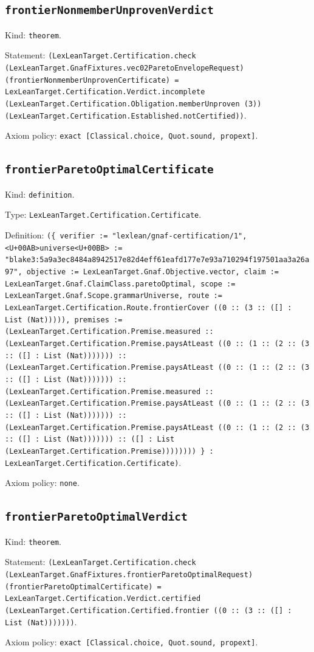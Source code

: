\documentclass[11pt]{article}
\begin{document}
\subsection*{\texttt{frontierNonmemberUnprovenVerdict}}
\noindent Kind: \texttt{theorem}.\par
\noindent Statement: \texttt{(LexLeanTarget.Certification.check (LexLeanTarget.GnafFixtures.vec02ParetoEnvelopeRequest) (frontierNonmemberUnprovenCertificate) = LexLeanTarget.Certification.Verdict.incomplete (LexLeanTarget.Certification.Obligation.memberUnproven (3)) (LexLeanTarget.Certification.Established.notCertified))}.\par
\noindent Axiom policy: \texttt{exact [Classical.choice, Quot.sound, propext]}.\par
\subsection*{\texttt{frontierParetoOptimalCertificate}}
\noindent Kind: \texttt{definition}.\par
\noindent Type: \texttt{LexLeanTarget.Certification.Certificate}.\par
\noindent Definition: \texttt{(\{ verifier := "lexlean/gnaf-certification/1", <U+00AB>universe<U+00BB> := "blake3:5a9a3ec8484a8942517e82d4eff61eafd177e7e93a710294f197501aa3a26a97", objective := LexLeanTarget.Gnaf.Objective.vector, claim := LexLeanTarget.Gnaf.ClaimClass.paretoOptimal, scope := LexLeanTarget.Gnaf.Scope.grammarUniverse, route := LexLeanTarget.Certification.Route.frontierCover ((0 :: (3 :: ([] : List (Nat))))), premises := (LexLeanTarget.Certification.Premise.measured :: (LexLeanTarget.Certification.Premise.paysAtLeast ((0 :: (1 :: (2 :: (3 :: ([] : List (Nat))))))) :: (LexLeanTarget.Certification.Premise.paysAtLeast ((0 :: (1 :: (2 :: (3 :: ([] : List (Nat))))))) :: (LexLeanTarget.Certification.Premise.measured :: (LexLeanTarget.Certification.Premise.paysAtLeast ((0 :: (1 :: (2 :: (3 :: ([] : List (Nat))))))) :: (LexLeanTarget.Certification.Premise.paysAtLeast ((0 :: (1 :: (2 :: (3 :: ([] : List (Nat))))))) :: ([] : List (LexLeanTarget.Certification.Premise)))))))) \} : LexLeanTarget.Certification.Certificate)}.\par
\noindent Axiom policy: \texttt{none}.\par
\subsection*{\texttt{frontierParetoOptimalVerdict}}
\noindent Kind: \texttt{theorem}.\par
\noindent Statement: \texttt{(LexLeanTarget.Certification.check (LexLeanTarget.GnafFixtures.frontierParetoOptimalRequest) (frontierParetoOptimalCertificate) = LexLeanTarget.Certification.Verdict.certified (LexLeanTarget.Certification.Certified.frontier ((0 :: (3 :: ([] : List (Nat)))))))}.\par
\noindent Axiom policy: \texttt{exact [Classical.choice, Quot.sound, propext]}.\par
\end{document}
